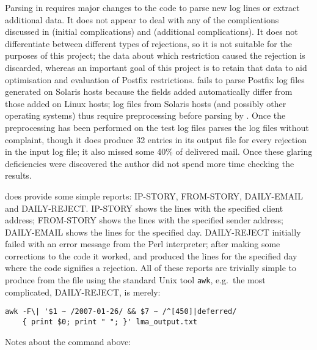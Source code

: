 Parsing in \LMA{} requires major changes to the code to parse new log lines
or extract additional data.  It does not appear to deal with any of the
complications discussed in  (initial
complications) and  (additional
complications).  It does not differentiate between different types of
rejections, so it is not suitable for the purposes of this project; the
data about which restriction caused the rejection is discarded, whereas an
important goal of this project is to retain that data to aid optimisation
and evaluation of Postfix restrictions.  \LMA{} fails to parse Postfix log
files generated on Solaris hosts because the fields added automatically
differ from those added on Linux hosts; log files from Solaris hosts (and
possibly other operating systems) thus require preprocessing before parsing
by \LMA{}.  Once the preprocessing has been performed on the
\numberOFlogFILES{} test log files \LMA{} parses the log files without
complaint, though it does produce 32 entries in its output file for every
rejection in the input log file; it also missed some 40\% of delivered
mail.  Once these glaring deficiencies were discovered the author did not
spend more time checking the results.

\LMA{} does provide some simple reports: IP-STORY, FROM-STORY, DAILY-EMAIL
and DAILY-REJECT\@.  IP-STORY shows the \CSV{} lines with the specified
client \IP{} address; FROM-STORY shows the \CSV{} lines with the specified
sender address; DAILY-EMAIL shows the \CSV{} lines for the specified day.
DAILY-REJECT initially failed with an error message from the Perl
interpreter; after making some corrections to the code it worked, and
produced the \CSV{} lines for the specified day where the \SMTP{} code
signifies a rejection.  All of these reports are trivially simple to
produce from the \CSV{} file using the standard Unix tool \texttt{awk},
e.g.\ the most complicated, DAILY-REJECT, is merely:

\begin{verbatim}
awk -F\| '$1 ~ /2007-01-26/ && $7 ~ /^[450]|deferred/
    { print $0; print " "; }' lma_output.txt
\end{verbatim}

Notes about the command above:


